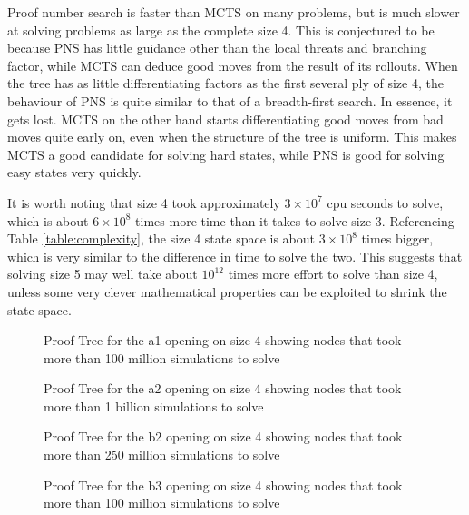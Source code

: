 Proof number search is faster than MCTS on many problems, but is much slower at solving problems as large as the complete size 4. This is conjectured to be because PNS has little guidance other than the local threats and branching factor, while MCTS can deduce good moves from the result of its rollouts. When the tree has as little differentiating factors as the first several ply of size 4, the behaviour of PNS is quite similar to that of a breadth-first search. In essence, it gets lost. MCTS on the other hand starts differentiating good moves from bad moves quite early on, even when the structure of the tree is uniform. This makes MCTS a good candidate for solving hard states, while PNS is good for solving easy states very quickly.

It is worth noting that size 4 took approximately $3 \times 10^7$ cpu seconds to solve, which is about $6 \times 10^8$ times more time than it takes to solve size 3. Referencing Table \ref{table:complexity}, the size 4 state space is about $3 \times 10^8$ times bigger, which is very similar to the difference in time to solve the two. This suggests that solving size 5 may well take about $10^{12}$ times more effort to solve than size 4, unless some very clever mathematical properties can be exploited to shrink the state space. %

\begin{figure}
\centering

\caption{Proof Tree for the a1 opening on size 4 showing nodes that took more than 100 million simulations to solve}
\label{fig:proof-a1}
\end{figure}

\begin{figure}
\centering

\caption{Proof Tree for the a2 opening on size 4 showing nodes that took more than 1 billion simulations to solve}
\label{fig:proof-a2}
\end{figure}

\begin{figure}
\centering

\caption{Proof Tree for the b2 opening on size 4 showing nodes that took more than 250 million simulations to solve}
\label{fig:proof-b2}
\end{figure}

\begin{figure}
\centering

\caption{Proof Tree for the b3 opening on size 4 showing nodes that took more than 100 million simulations to solve}
\label{fig:proof-b3}
\end{figure}

